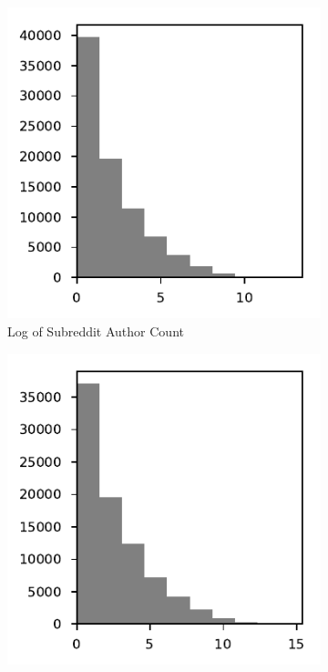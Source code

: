 \documentclass{article}
\begin{document}

\begin{figure}
     \centering
     \begin{subfigure}[b]{0.49\textwidth}
         \centering
         \includegraphics[width=\textwidth]{hist-author_count-log.pdf}
         \caption{Log of Subreddit Author Count}
         \label{hist:author}
     \end{subfigure}
     \hfill
     \begin{subfigure}[b]{0.49\textwidth}
         \centering
         \includegraphics[width=\textwidth]{hist-comment_count-log.pdf}

\end{subfigure}
\end{figure}
\end{document}
